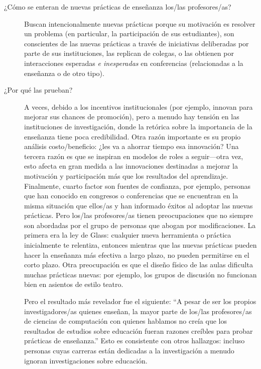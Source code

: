 \begin{description}


\item[¿Cómo se enteran de nuevas prácticas de enseñanza los/las profesores/as?]

Buscan intencionalmente nuevas prácticas
porque su motivación es  resolver un problema (en particular, la participación de sus estudiantes),
son conscientes de las nuevas prácticas a través de iniciativas deliberadas por parte de sus instituciones,
las replican de colegas,
o las obtienen por interacciones esperadas  \emph{e inesperadas} en conferencias
(relacionadas a la enseñanza o de otro tipo).

\item[¿Por qué las prueban?]

A veces, debido a los incentivos institucionales
(por ejemplo, innovan para mejorar sus chances de promoción),
pero a menudo hay tensión en las instituciones de investigación,
donde la retórica sobre la importancia de la enseñanza tiene poca credibilidad.
Otra razón importante es su propio análisis costo/beneficio:
¿les va a ahorrar tiempo esa innovación?
Una tercera razón es que se inspiran en modelos de roles a seguir---otra vez,
esto afecta en gran medida a las innovaciones destinadas a  mejorar la motivación y participación más que los resultados del aprendizaje.
Finalmente, cuarto factor son fuentes de confianza,
por ejemplo, personas que han  conocido en congresos o conferencias que se encuentran en la misma situación que ellos/as 
y han informado éxitos al adoptar las nuevas prácticas.
Pero los/las profesores/as tienen preocupaciones que no siempre son abordadas por el grupo de personas que abogan por modificaciones.
La primera era la ley de Glass:
cualquier nueva herramienta o práctica inicialmente te relentiza,
entonces mientras que las nuevas prácticas pueden hacer la enseñanza más efectiva a largo plazo, no pueden permitirse en el corto plazo.
Otra preocupación es que el diseño físico de las aulas dificulta muchas prácticas nuevas:
por ejemplo,
los grupos de discusión no funcionan bien en asientos de estilo teatro.

Pero el resultado más revelador fue el siguiente:
``A pesar de ser los propios investigadores/as quienes enseñan,
la mayor parte de los/las profesores/as de ciencias de computación con quienes hablamos
no creía que los resultados de estudios sobre educación fueran razones creíbles para probar prácticas de enseñanza.”
Esto es consistente con otros hallazgos:
incluso personas cuyas carreras están dedicadas  a la investigación a menudo ignoran investigaciones sobre educación. 


\end{description}
